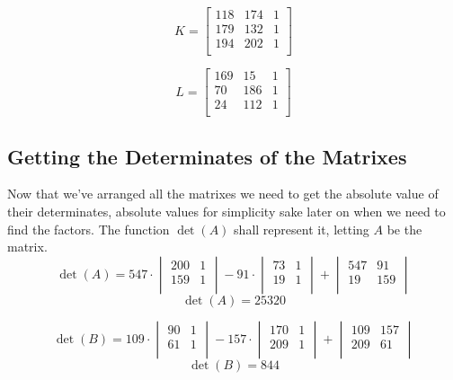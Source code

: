 \documentclass[12pft, english]{article}
\begin{document}
\begin{multicols}{2}
  \[
    K =
    \begin{bmatrix}
      118 & 174 & 1 \\
      179 & 132 & 1 \\
      194 & 202 & 1\\
    \end{bmatrix}
  \]

  \[
    L =
    \begin{bmatrix}
      169 & 15  & 1 \\
      70  & 186 & 1 \\
      24  & 112 & 1\\
    \end{bmatrix}
  \]

  \subsection{Getting the Determinates of the Matrixes}
  Now that we've arranged all the matrixes we need to get the absolute value of their determinates, absolute values for simplicity sake later on when we need to find the factors. The function \(\det(A)\) shall represent it, letting \(A\) be the matrix.
  \[
    \det(A) =
    547 \cdot
    \begin{vmatrix}
      200 & 1 \\
      159 & 1 \\
    \end{vmatrix}
    -
    91 \cdot
    \begin{vmatrix}
      73 & 1 \\
      19 & 1 \\
    \end{vmatrix}
    +
    \begin{vmatrix}
      547 & 91 \\
      19 & 159 \\
    \end{vmatrix}
  \]
  \[
    \det(A) = 25320
  \]

  \[
    \det(B) =
    109 \cdot
    \begin{vmatrix}
      90 & 1 \\
      61 & 1 \\
    \end{vmatrix}
    -
    157 \cdot
    \begin{vmatrix}
      170 & 1 \\
      209 & 1 \\
    \end{vmatrix}
    +
    \begin{vmatrix}
      109 & 157 \\
      209 & 61 \\
    \end{vmatrix}
  \]
  \[
    \det(B) = 844
  \]


\end{multicols}
\end{document}
